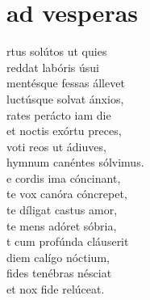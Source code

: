 \thispagestyle{plain}
\section{ad vesperas}


\def\greinitialformat#1{{\fontsize{45}{45}\selectfont #1}}

\vspace{0.3cm}



\vspace{0.15cm}



\def\greinitialformat#1{{\fontsize{40}{40}\selectfont #1}}

\begin{multicols}{2}
 
\noindent{}rtus solútos ut quies\\
reddat labóris úsui\\
mentésque fessas állevet\\
luctúsque solvat ánxios,\\

\noindent{}rates perácto iam die\\
et noctis exórtu preces,\\ 
voti reos ut ádiuves,\\ 
hymnum canéntes sólvimus.\\

\noindent{}e cordis ima cóncinant, \\
te vox canóra cóncrepet, \\
te díligat castus amor, \\
te mens adóret sóbria, \\

\noindent{}t cum profúnda cláuserit\\
diem calígo nóctium,\\ 
fides tenébras nésciat\\
et nox fide relúceat.\\


\end{multicols}

